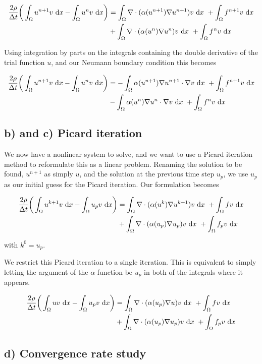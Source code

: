 \documentclass[a4paper, 11pt, notitlepage, english]{article}
\renewcommand{\d}{{\rm d}}
\begin{document}
\begin{align*}
\frac{2\rho}{\Delta t} \bigg(\int_\Omega u^{n+1} v \ \d x - \int_\Omega u^n v\  \d x \bigg) &= \int_\Omega\nabla \cdot(\alpha(u^{n+1})\nabla u^{n+1})v\ \d x \ + \int_\Omega f^{n+1}v\ \d x \\
& + \int_\Omega\nabla\cdot(\alpha(u^n)\nabla u^n)v\ \d x \ + \int_\Omega f^nv\ \d x
\end{align*}

Using integration by parts on the integrals containing the double derivative of the trial function $u$, and our Neumann boundary condition this becomes

\begin{align*}
\frac{2\rho}{\Delta t} \bigg(\int_\Omega u^{n+1} v \ \d x - \int_\Omega u^n v\  \d x \bigg) &= - \int_\Omega \alpha(u^{n+1})\nabla u^{n+1}\cdot\nabla v\ \d x \ + \int_\Omega f^{n+1}v\ \d x \\
& - \int_\Omega \alpha(u^n)\nabla u^n\cdot\nabla v\ \d x \ + \int_\Omega f^nv\ \d x
\end{align*}

\subsection*{b) and c) Picard iteration}

We now have a nonlinear system to solve, and we want to use a Picard iteration method to reformulate this as a linear problem. Renaming the solution to be found, 
$u^{n+1}$  as simply $u$, and the solution at the previous time step $u_p$, we use $u_p$ as our initial guess for the Picard iteration. Our formulation becomes 

\begin{align*}
\frac{2\rho}{\Delta t} \bigg(\int_\Omega u^{k+1} v \ \d x - \int_\Omega u_p v\  \d x \bigg) &= \int_\Omega\nabla \cdot(\alpha(u^{k})\nabla u^{k+1})v\ \d x \ + \int_\Omega f v\ \d x \\
& + \int_\Omega\nabla\cdot(\alpha(u_p)\nabla u_p)v\ \d x \ + \int_\Omega f_pv\ \d x
\end{align*}

with $k^0=u_p$.

We restrict this Picard iteration to a single iteration. This is equivalent to simply letting the argument of the $\alpha$-function be $u_p$ in both of the integrals 
where it appears. 

\begin{align*}
\frac{2\rho}{\Delta t} \bigg(\int_\Omega u v \ \d x - \int_\Omega u_p v\  \d x \bigg) &= \int_\Omega\nabla \cdot(\alpha(u_p)\nabla u)v\ \d x \ + \int_\Omega f v\ \d x \\
& + \int_\Omega\nabla\cdot(\alpha(u_p)\nabla u_p)v\ \d x \ + \int_\Omega f_pv\ \d x
\end{align*}


\subsection*{d) Convergence rate study}
\end{document}
